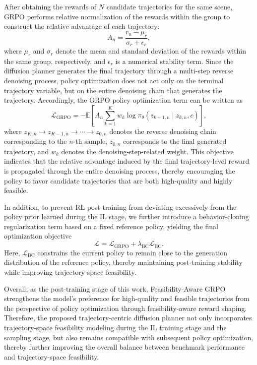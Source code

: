 \documentclass[3p,times,authoryear]{elsarticle}
\begin{document}
After obtaining the rewards of \(N\) candidate trajectories for the same scene, GRPO performs relative normalization of the rewards within the group to construct the relative advantage of each trajectory:
\begin{equation}
A_n = \frac{r_n - \mu_r}{\sigma_r + \epsilon_r},
\end{equation}
where \(\mu_r\) and \(\sigma_r\) denote the mean and standard deviation of the rewards within the same group, respectively, and \(\epsilon_r\) is a numerical stability term. Since the diffusion planner generates the final trajectory through a multi-step reverse denoising process, policy optimization does not act only on the terminal trajectory variable, but on the entire denoising chain that generates the trajectory. Accordingly, the GRPO policy optimization term can be written as
\begin{equation}
\mathcal{L}_{\mathrm{GRPO}}
=
-\mathbb{E}\!\left[
A_n
\sum_{k=1}^{K}
w_k \log \pi_{\theta}\!\left(z_{k-1,n}\mid z_{k,n}, c\right)
\right],
\end{equation}
where $z_{K,n} \rightarrow z_{K-1,n} \rightarrow \cdots \rightarrow z_{0,n}$ denotes the reverse denoising chain corresponding to the \(n\)-th sample, \(z_{0,n}\) corresponds to the final generated trajectory, and \(w_k\) denotes the denoising-step-related weight. This objective indicates that the relative advantage induced by the final trajectory-level reward is propagated through the entire denoising process, thereby encouraging the policy to favor candidate trajectories that are both high-quality and highly feasible. 

In addition, to prevent RL post-training from deviating excessively from the policy prior learned during the IL stage, we further introduce a behavior-cloning regularization term based on a fixed reference policy, yielding the final optimization objective
\begin{equation}
\mathcal{L}
=
\mathcal{L}_{\mathrm{GRPO}}
+
\lambda_{\mathrm{BC}} \mathcal{L}_{\mathrm{BC}}.
\end{equation}
Here, \(\mathcal{L}_{\mathrm{BC}}\) constrains the current policy to remain close to the generation distribution of the reference policy, thereby maintaining post-training stability while improving trajectory-space feasibility.

Overall, as the post-training stage of this work, Feasibility-Aware GRPO strengthens the model’s preference for high-quality and feasible trajectories from the perspective of policy optimization through feasibility-aware reward shaping. Therefore, the proposed trajectory-centric diffusion planner not only incorporates trajectory-space feasibility modeling during the IL training stage and the sampling stage, but also remains compatible with subsequent policy optimization, thereby further improving the overall balance between benchmark performance and trajectory-space feasibility.
\end{document}
